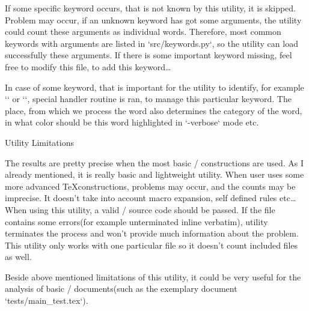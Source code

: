 If some specific keyword occurs, that is not known by this utility, it is skipped. Problem may occur, if an unknown keyword has got some arguments, the utility could count these arguments as individual words. Therefore, most common keywords with arguments are listed in `src/keywords.py`, so the utility can load successfully these arguments. If there is some important keyword missing, feel free to modify this file, to add this keyword\dots

In case of some keyword, that is important for the utility to identify, for example {\Blue `\sec`} or {\Blue `\fnote`}, special handler routine is ran, to manage this particular keyword. The place, from which we process the word also determines the category of the word, in what color should be this word highlighted in {\Blue `-verbose`} mode etc.


\sec Utility Limitations

The results are pretty precise when the most basic \OpTeX/ constructions are used. As I already mentioned, it is really basic and lightweight utility. When user uses some more advanced \TeX constructions, problems may occur, and the counts may be imprecise. It doesn't take into account macro expansion, self defined rules etc\dots When using this utility, a valid \OpTeX/ source code should be passed. If the file contains some errors(for example unterminated inline verbatim), utility terminates the process and won't provide much information about the problem. This utility only works with one particular file so it doesn't count included files as well.

Beside above mentioned limitations of this utility, it could be very useful for the analysis of basic \OpTeX/ documents(such as the exemplary document {\Blue `tests/main_test.tex`}).

\bye
